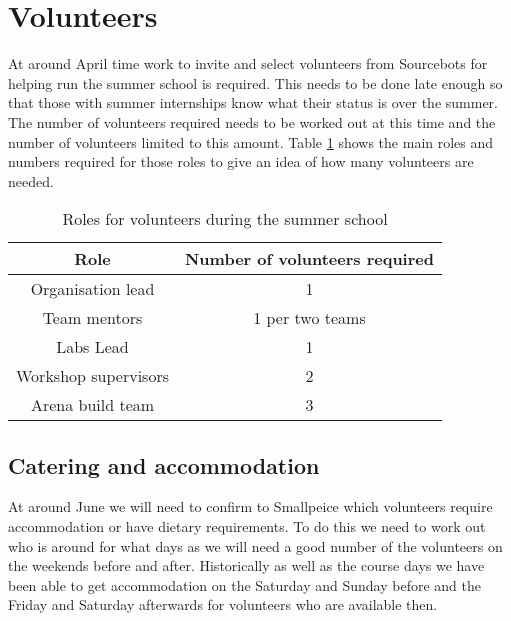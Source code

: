 \section{Volunteers}

At around April time work to invite and select volunteers from Sourcebots for helping run the summer school is required.
This needs to be done late enough so that those with summer internships know what their status is over the summer.
The number of volunteers required needs to be worked out at this time and the number of volunteers limited to this amount.
Table \ref{tab:volunteerroles} shows the main roles and numbers required for those roles to give an idea of how many volunteers are needed.

\begin{table}
    \centering
    \begin{tabular}{cc}
        Role & Number of volunteers required \\
        \hline
        Organisation lead & 1 \\
        Team mentors & 1 per two teams \\
        Labs Lead & 1 \\
        Workshop supervisors & 2 \\
        Arena build team & 3\\
    \end{tabular}
    \caption{Roles for volunteers during the summer school}
    \label{tab:volunteerroles}
\end{table}



\subsection{Catering and accommodation}

At around June we will need to confirm to Smallpeice which volunteers require accommodation or have dietary requirements.
To do this we need to work out who is around for what days as we will need a good number of the volunteers on the weekends before and after.
Historically as well as the course days we have been able to get accommodation on the Saturday and Sunday before and the Friday and Saturday afterwards for volunteers who are available then.

